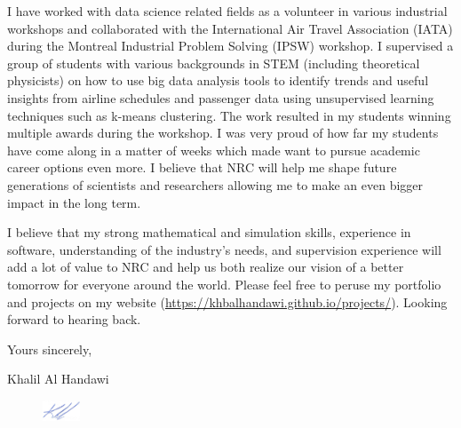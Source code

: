 \documentclass[12pt]{article} %
\begin{document}
\medskip %

I have worked with data science related fields as a volunteer in various industrial workshops and collaborated with the International Air Travel Association (IATA) during the Montreal Industrial Problem Solving (IPSW) workshop. I supervised a group of students with various backgrounds in STEM (including theoretical physicists) on how to use big data analysis tools to identify trends and useful insights from airline schedules and passenger data using unsupervised learning techniques such as k-means clustering. The work resulted in my students winning multiple awards during the workshop. I was very proud of how far my students have come along in a matter of weeks which made want to pursue academic career options even more. I believe that NRC will help me shape future generations of scientists and researchers allowing me to make an even bigger impact in the long term.

\medskip %

I believe that my strong mathematical and simulation skills, experience in software, understanding of the industry's needs, and supervision experience will add a lot of value to NRC and help us both realize our vision of a better tomorrow for everyone around the world. Please feel free to peruse my portfolio and projects on my website (\href{https://khbalhandawi.github.io/projects/}{https://khbalhandawi.github.io/projects/}). Looking forward to hearing back.

\medskip %

Yours sincerely,

Khalil Al Handawi

\begin{figure}[h]
	\includegraphics[width=0.1\textwidth]{Signiture.png}
\end{figure}

\medskip %

\end{document}
